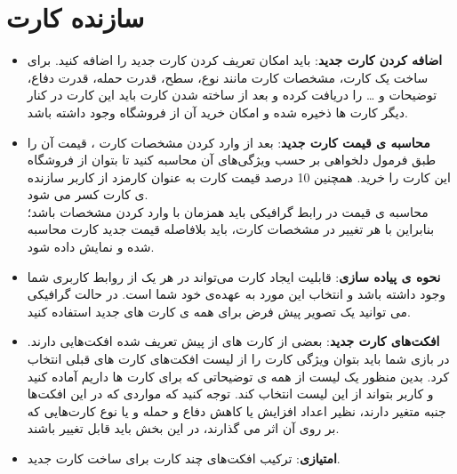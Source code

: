 \documentclass[]{article}
\begin{document}
\section*{{\titr سازنده کارت}}

\begin{itemize}
    \item \textbf{اضافه کردن کارت جدید}: باید امکان تعریف کردن کارت جدید را اضافه کنید. برای ساخت یک کارت، مشخصات کارت مانند نوع، سطح، قدرت حمله، قدرت دفاع، توضیحات و … را دریافت کرده و بعد از ساخته شدن کارت باید این کارت در کنار دیگر کارت ها ذخیره شده و امکان خرید آن از فروشگاه وجود داشته باشد.
    \item \textbf{محاسبه ی قیمت کارت جدید}: بعد از وارد کردن مشخصات کارت ، قیمت آن را طبق فرمول دلخواهی بر حسب ویژگی‌های آن محاسبه کنید تا بتوان از فروشگاه این کارت را خرید. همچنین 10 درصد قیمت کارت به عنوان کارمزد از کاربر سازنده ی کارت کسر می شود. \\
    محاسبه ی قیمت در رابط گرافیکی باید همزمان با وارد کردن مشخصات باشد؛ بنابراین با هر تغییر در مشخصات کارت، باید بلافاصله قیمت جدید کارت محاسبه شده و نمایش داده شود.
    \item \textbf{نحوه ی پیاده سازی}: قابلیت ایجاد کارت می‌تواند در هر یک از روابط کاربری شما وجود داشته باشد و انتخاب این مورد به عهده‌ی خود شما است. در حالت گرافیکی می توانید یک تصویر پیش فرض برای همه ی کارت های جدید استفاده کنید. 
    \item \textbf{افکت‌های کارت جدید}: 
    بعضی از کارت های از پیش تعریف شده افکت‌هایی دارند. در بازی شما باید بتوان ویژگی کارت را از لیست افکت‌های کارت های قبلی انتخاب کرد. بدین منظور یک لیست از همه ی توضیحاتی که برای کارت ها داریم آماده کنید و کاربر بتواند از این لیست انتخاب کند. توجه کنید که مواردی که در این افکت‌ها جنبه متغیر دارند، نظیر اعداد افزایش یا کاهش دفاع و حمله و یا نوع کارت‌هایی که بر روی آن اثر می گذارند، در این بخش باید قابل تغییر باشند.
    
    \item \textbf{امتیازی}: ترکیب افکت‌های چند کارت برای ساخت کارت جدید.

\end{itemize}
\end{document}
